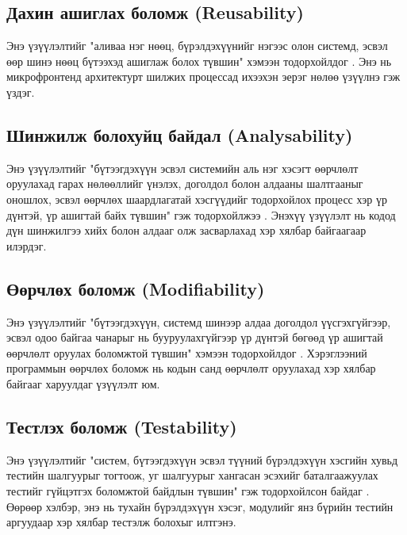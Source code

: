 \subsection{Дахин ашиглах боломж (Reusability)}
Энэ үзүүлэлтийг "аливаа нэг нөөц, бүрэлдэхүүнийг нэгээс олон системд, эсвэл өөр шинэ нөөц бүтээхэд ашиглаж болох түвшин" хэмээн тодорхойлдог \cite{iso25010_2}. Энэ нь микрофронтенд архитектурт шилжих процессад ихээхэн эерэг нөлөө үзүүлнэ гэж үздэг.

\subsection{Шинжилж болохуйц байдал (Analysability)}
Энэ үзүүлэлтийг "бүтээгдэхүүн эсвэл системийн аль нэг хэсэгт өөрчлөлт оруулахад гарах нөлөөллийг үнэлэх, доголдол болон алдааны шалтгааныг оношлох, эсвэл өөрчлөх шаардлагатай хэсгүүдийг тодорхойлох процесс хэр үр дүнтэй, үр ашигтай байх түвшин" гэж тодорхойлжээ \cite{iso25010_2}. Энэхүү үзүүлэлт нь кодод дүн шинжилгээ хийх болон алдааг олж засварлахад хэр хялбар байгаагаар илэрдэг.

\subsection{Өөрчлөх боломж (Modifiability)}
Энэ үзүүлэлтийг "бүтээгдэхүүн, системд шинээр алдаа доголдол үүсгэхгүйгээр, эсвэл одоо байгаа чанарыг нь бууруулахгүйгээр үр дүнтэй бөгөөд үр ашигтай өөрчлөлт оруулах боломжтой түвшин" хэмээн тодорхойлдог \cite{iso25010_2}. Хэрэглээний программын өөрчлөх боломж нь кодын санд өөрчлөлт оруулахад хэр хялбар байгааг харуулдаг үзүүлэлт юм.

\subsection{Тестлэх боломж (Testability)}
Энэ үзүүлэлтийг "систем, бүтээгдэхүүн эсвэл түүний бүрэлдэхүүн хэсгийн хувьд тестийн шалгуурыг тогтоож, уг шалгуурыг хангасан эсэхийг баталгаажуулах тестийг гүйцэтгэх боломжтой байдлын түвшин" гэж тодорхойлсон байдаг \cite{iso25010_2}. Өөрөөр хэлбэр, энэ нь тухайн бүрэлдэхүүн хэсэг, модулийг янз бүрийн тестийн аргуудаар хэр хялбар тестэлж болохыг илтгэнэ.

